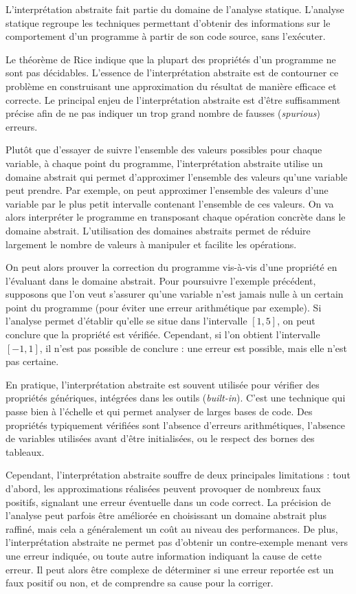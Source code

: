 L'interprétation abstraite fait partie du domaine de l'analyse statique.
L'analyse statique regroupe les techniques permettant d'obtenir des
informations sur le comportement d'un programme à partir de son code
source, sans l'exécuter.

Le théorème de Rice indique que la plupart des propriétés d'un programme
ne sont pas décidables. L'essence de l'interprétation abstraite est de
contourner ce problème en construisant une approximation du résultat de
manière efficace et correcte. Le principal enjeu de
l'interprétation abstraite est d'être suffisamment précise afin de ne
pas indiquer un trop grand nombre de fausses (\emph{spurious}) erreurs.

Plutôt que d'essayer de suivre l'ensemble des valeurs possibles pour chaque
variable, à chaque point du programme, l'interprétation abstraite utilise un
domaine abstrait qui permet d'approximer l'ensemble des valeurs qu'une variable
peut prendre. Par exemple, on peut approximer l'ensemble des valeurs d'une
variable par le plus petit intervalle contenant l'ensemble de ces valeurs. On va
alors interpréter le programme en transposant chaque opération concrète dans le
domaine abstrait. L'utilisation des domaines abstraits permet de réduire
largement le nombre de valeurs à manipuler et facilite les opérations.

On peut alors prouver la correction du programme vis-à-vis d'une
propriété en l'évaluant dans le domaine abstrait. Pour poursuivre
l'exemple précédent, supposons que l'on veut s'assurer qu'une variable n'est jamais
nulle à un certain point du programme (pour éviter une erreur arithmétique
par exemple). Si l'analyse permet d'établir qu'elle se situe dans
l'intervalle \([1, 5]\), on peut conclure que la propriété est vérifiée.
Cependant, si l'on obtient l'intervalle \([-1, 1]\), il n'est pas possible
de conclure : une erreur est possible, mais elle n'est pas certaine.

En pratique, l'interprétation abstraite est souvent utilisée pour
vérifier des propriétés génériques, intégrées dans les outils
(\emph{built-in}). C'est une technique qui
passe bien à l'échelle et qui permet analyser de larges bases de code. Des
propriétés typiquement vérifiées sont l'absence d'erreurs arithmétiques,
l'absence de variables utilisées avant d'être initialisées, ou le
respect des bornes des tableaux.

Cependant, l'interprétation abstraite souffre de deux principales limitations
: tout d'abord, les approximations réalisées peuvent provoquer de
nombreux faux positifs, signalant une erreur éventuelle dans un code
correct. La précision de l'analyse peut parfois être améliorée en
choisissant un domaine abstrait plus raffiné, mais cela a généralement
un coût au niveau des performances. De plus, l'interprétation abstraite
ne permet pas d'obtenir un contre-exemple menant vers une erreur
indiquée, ou toute autre information indiquant la cause de cette erreur.
Il peut alors être complexe de déterminer si une erreur reportée est un
faux positif ou non, et de comprendre sa cause pour la corriger.

